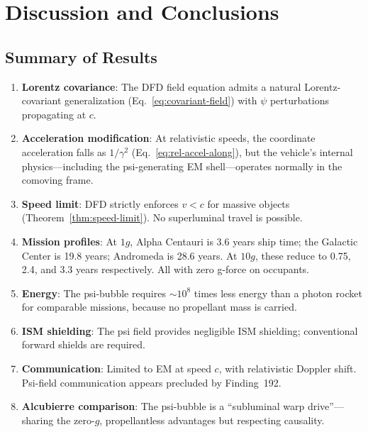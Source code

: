 \documentclass[aps,prd,twocolumn,superscriptaddress,nofootinbib]{revtex4-2}
\begin{document}
\section{Discussion and Conclusions}\label{sec:conclusions}

\subsection{Summary of Results}

\begin{enumerate}
\item \textbf{Lorentz covariance}: The DFD field equation admits a
natural Lorentz-covariant generalization
(Eq.~\ref{eq:covariant-field}) with $\psi$ perturbations propagating
at $c$.

\item \textbf{Acceleration modification}: At relativistic speeds, the
coordinate acceleration falls as $1/\gamma^2$
(Eq.~\ref{eq:rel-accel-along}), but the vehicle's internal
physics---including the psi-generating EM shell---operates normally
in the comoving frame.

\item \textbf{Speed limit}: DFD strictly enforces $v < c$ for massive
objects (Theorem~\ref{thm:speed-limit}).  No superluminal travel is
possible.

\item \textbf{Mission profiles}: At $1g$, Alpha Centauri is 3.6 years
ship time; the Galactic Center is 19.8 years; Andromeda is 28.6 years.
At $10g$, these reduce to 0.75, 2.4, and 3.3 years respectively.
All with zero g-force on occupants.

\item \textbf{Energy}: The psi-bubble requires $\sim 10^8$ times less
energy than a photon rocket for comparable missions, because no
propellant mass is carried.

\item \textbf{ISM shielding}: The psi field provides negligible ISM
shielding; conventional forward shields are required.

\item \textbf{Communication}: Limited to EM at speed $c$, with
relativistic Doppler shift.  Psi-field communication appears
precluded by Finding~192.

\item \textbf{Alcubierre comparison}: The psi-bubble is a
``subluminal warp drive''---sharing the zero-$g$, propellantless
advantages but respecting causality.
\end{enumerate}
\end{document}
